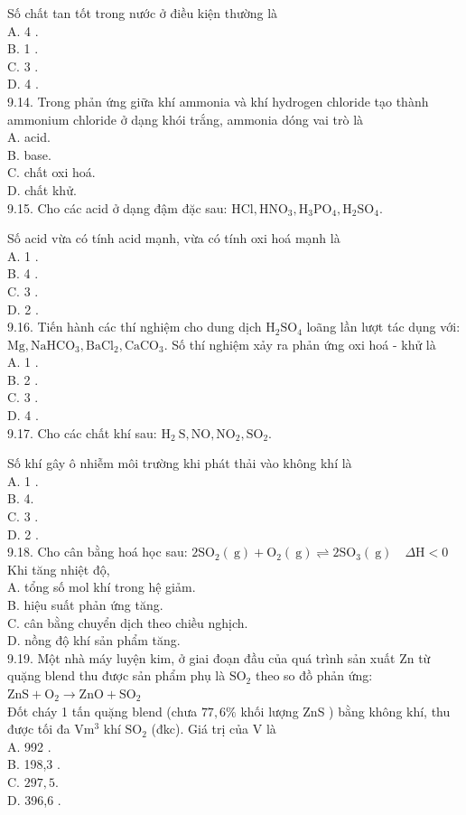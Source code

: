 \documentclass[10pt]{article}
\begin{document}
Số chất tan tốt trong nước ở điều kiện thường là\\
A. 4 .\\
B. 1 .\\
C. 3 .\\
D. 4 .\\
9.14. Trong phản ứng giữa khí ammonia và khí hydrogen chloride tạo thành ammonium chloride ở dạng khói trắng, ammonia dóng vai trò là\\
A. acid.\\
B. base.\\
C. chất oxi hoá.\\
D. chất khử.\\
9.15. Cho các acid ở dạng đậm đặc sau: $\mathrm{HCl}, \mathrm{HNO}_{3}, \mathrm{H}_{3} \mathrm{PO}_{4}, \mathrm{H}_{2} \mathrm{SO}_{4}$.

Số acid vừa có tính acid mạnh, vừa có tính oxi hoá mạnh là\\
A. 1 .\\
B. 4 .\\
C. 3 .\\
D. 2 .\\
9.16. Tiến hành các thí nghiệm cho dung dịch $\mathrm{H}_{2} \mathrm{SO}_{4}$ loãng lần lượt tác dụng với: $\mathrm{Mg}, \mathrm{NaHCO}_{3}, \mathrm{BaCl}_{2}, \mathrm{CaCO}_{3}$. Số thí nghiệm xảy ra phản ứng oxi hoá - khử là\\
A. 1 .\\
B. 2 .\\
C. 3 .\\
D. 4 .\\
9.17. Cho các chất khí sau: $\mathrm{H}_{2} \mathrm{~S}, \mathrm{NO}, \mathrm{NO}_{2}, \mathrm{SO}_{2}$.

Số khí gây ô nhiễm môi trường khi phát thải vào không khí là\\
A. 1 .\\
B. 4.\\
C. 3 .\\
D. 2 .\\
9.18. Cho cân bằng hoá học sau: $2 \mathrm{SO}_{2}(\mathrm{~g})+\mathrm{O}_{2}(\mathrm{~g}) \rightleftharpoons 2 \mathrm{SO}_{3}(\mathrm{~g}) \quad \Delta \mathrm{H}<0$ Khi tăng nhiệt độ,\\
A. tổng số mol khí trong hệ giảm.\\
B. hiệu suất phản ứng tăng.\\
C. cân bằng chuyển dịch theo chiều nghịch.\\
D. nồng độ khí sản phẩm tăng.\\
9.19. Một nhà máy luyện kim, ở giai đoạn đầu của quá trình sản xuất Zn từ quặng blend thu được sản phẩm phụ là $\mathrm{SO}_{2}$ theo so đồ phản ứng:\\
$\mathrm{ZnS}+\mathrm{O}_{2} \longrightarrow \mathrm{ZnO}+\mathrm{SO}_{2}$\\
Đốt cháy 1 tấn quặng blend (chưa $77,6 \%$ khối lượng ZnS ) bằng không khí, thu được tối đa $\mathrm{V} \mathrm{m}^{3}$ khí $\mathrm{SO}_{2}$ (đkc). Giá trị của V là\\
A. 992 .\\
B. 198,3 .\\
C. $297,5$.\\
D. 396,6 .
\end{document}
